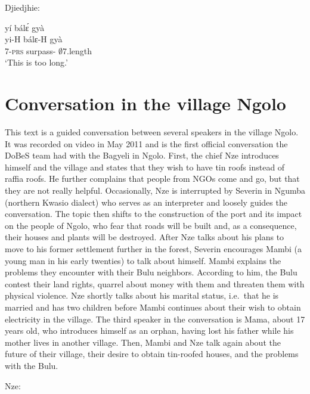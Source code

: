 \noindent Djiedjhie:

\begin{exe}[(N234)]
\exN\label{n257}
  \glll yí bálɛ́ gyà \\
        yi-H bálɛ-H gyà \\
        7-\textsc{prs} surpass-{\R} $\emptyset$7.length   \\
    \trans `This is too long.'
\end{exe}


\pagebreak

\section{Conversation in the village Ngolo}
\label{sec:Conversation}

This text is a guided conversation between several speakers in the village Ngolo. It was recorded on video in May 2011 and is the first official conversation the DoBeS team had with the Bagyeli in Ngolo.  First, the chief Nze introduces himself and the village and states that they wish to have tin roofs instead of raffia roofs. He further complains that people from NGOs come and go, but that they are not really helpful. Occasionally, Nze is interrupted by Severin in Ngumba (northern Kwasio dialect) who serves as an interpreter and loosely guides the conversation. The topic then shifts to the construction of the port and its impact on the people of Ngolo, who fear that roads will be built and, as a consequence, their houses and plants will be destroyed. After Nze talks about his plans to move to his former settlement further in the forest, Severin encourages Mambi (a young man in his early twenties) to talk about himself. Mambi explains the problems they encounter with their Bulu neighbors. According to him, the Bulu contest their land rights, quarrel about money with them and threaten them with physical violence.
Nze shortly talks about his marital status, i.e.\ that he is married and has two children before Mambi continues about their wish to obtain electricity in the village. The third speaker in the conversation is Mama, about 17 years old, who introduces himself as an orphan, having lost his father while his mother lives in another village. Then, Mambi and Nze talk again about the future of their village, their desire to obtain tin-roofed houses, and the problems with the Bulu.

\noindent Nze:

